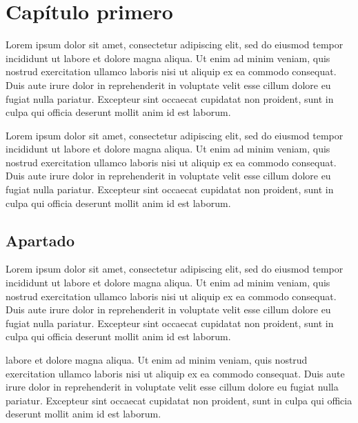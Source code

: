 \documentclass[12pt,a4paper]{report}
\newcommand{\headlinecolor}{\color{slcolor}}
\begin{document}
	

\chapter{Capítulo primero}\label{cap:cap1}

Lorem ipsum dolor sit amet, consectetur adipiscing elit, sed do eiusmod tempor incididunt ut labore et dolore magna aliqua. Ut enim ad minim veniam, quis nostrud exercitation ullamco laboris nisi ut aliquip ex ea commodo consequat. Duis aute irure dolor in reprehenderit in voluptate velit esse cillum dolore eu fugiat nulla pariatur. Excepteur sint occaecat cupidatat non proident, sunt in culpa qui officia deserunt mollit anim id est laborum.

Lorem ipsum dolor sit amet, consectetur adipiscing elit, sed do eiusmod tempor incididunt ut labore et dolore magna aliqua. Ut enim ad minim veniam, quis nostrud exercitation ullamco laboris nisi ut aliquip ex ea commodo consequat. Duis aute irure dolor in reprehenderit in voluptate velit esse cillum dolore eu fugiat nulla pariatur. Excepteur sint occaecat cupidatat non proident, sunt in culpa qui officia deserunt mollit anim id est laborum.


\section{Apartado}\label{sec:apartado}


Lorem ipsum dolor sit amet, consectetur adipiscing elit, sed do eiusmod tempor incididunt ut labore et dolore magna aliqua. Ut enim ad minim veniam, quis nostrud exercitation ullamco laboris nisi ut aliquip ex ea commodo consequat. Duis aute irure dolor in reprehenderit in voluptate velit esse cillum dolore eu fugiat nulla pariatur. Excepteur sint occaecat cupidatat non proident, sunt in culpa qui officia deserunt mollit anim id est laborum.

\begin{center}
{\textbf{\headlinecolor{Destacado duis aute irure dolor\\ 
in reprehenderit in voluptate velit esse\\ 
cillum dolore eu fugiat}}}
\end{center}

labore et dolore magna aliqua. Ut enim ad minim veniam, quis nostrud exercitation ullamco laboris nisi ut aliquip ex ea commodo consequat. Duis aute irure dolor in reprehenderit in voluptate velit esse cillum dolore eu fugiat nulla pariatur. Excepteur sint occaecat cupidatat non proident, sunt in culpa qui officia deserunt mollit anim id est laborum.
\end{document}
